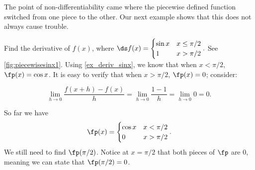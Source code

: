 The point of non-differentiability came where the piecewise defined function switched from one piece to the other. Our next example shows that this does not always cause trouble.\bigskip

\begin{example}\label{ex_diff_piecewise}
Find the derivative of $f(x)$, where $\ds f(x) = \begin{cases}\sin x & x\leq \pi/2 \\ 1 & x>\pi/2 \end{cases}.$ See \autoref{fig:piecewisesinx1}.
\solution
Using \autoref{ex_deriv_sinx}, we know that when $x<\pi/2$, $\fp(x) = \cos x$. It is easy to verify that when $x>\pi/2$, $\fp(x) = 0$; consider:


\[
 \lim_{h\to0}\frac{f(x+h) - f(x)}{h}
 = \lim_{h\to0}\frac{1-1}{h} = \lim_{h\to0}0 =0.
\]

So far we have
\[\fp(x) = \begin{cases}\cos x & x<\pi/2\\ 0 & x>\pi/2\end{cases}.\]
We still need to find $\fp(\pi/2)$. Notice at $x=\pi/2$ that both pieces of $\fp$ are 0, meaning we can state that $\fp(\pi/2)=0$. 


\end{example}
